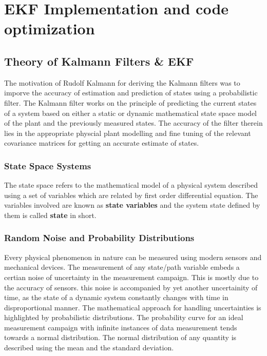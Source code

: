 \chapter{EKF Implementation and code optimization}

\section{Theory of Kalmann Filters \& EKF}

The motivation of Rudolf Kalmann for deriving the Kalmann filters was to imporve the accuracy of estimation and prediction of states using a probabilistic filter. The Kalmann filter works on the principle of predicting the current states of a system based on either a static or dynamic mathematical state space model of the plant and the previously measured states. The accuracy of the filter therein lies in the appropriate physcial plant modelling and fine tuning of the relevant covariance matrices for getting an accurate estimate of states.

\subsection{State Space Systems}
The state space refers to the mathematical model of a physical system described using a set of variables which are related by first order differential equation. The variables involved are known as \textbf{state variables} and the system state defined by them is called \textbf{state} in short.

\subsection{Random Noise and Probability Distributions}

Every physical phenomenon in nature can be measured using modern sensors and mechanical devices. The measurement of any state/path variable embeds a certian noise of uncertainty in the measurement campaign. This is mostly due to the accuracy of sensors. this noise is accompanied by yet another uncertainity of time, as the state of a dynamic system constantly changes with time in disproportional manner. The mathematical approach for handling uncertainties is highlighted by probabilistic distributions. The probability curve for an ideal measurement campaign with infinite instances of data measurement tends towards a normal distribution. The normal distribution of any quantity is described using the mean and the standard deviation.

